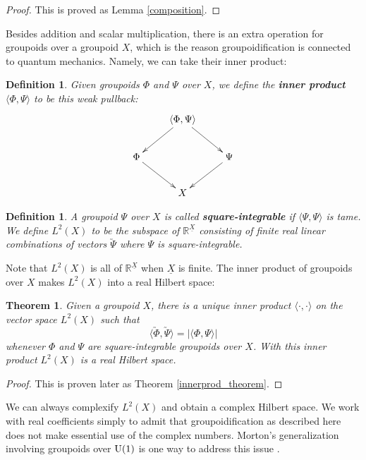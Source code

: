 \documentclass{article}
\newcommand{\R}{{\mathbb R}}
\newcommand{\U}{{\rm U}}
\newcommand{\ip}[2]{\langle #1,#2 \rangle}
\renewcommand{\u}[1]{\underline{#1}}
\newtheorem{definition}[thm]{Definition}
\newtheorem*{theorem*}{Theorem}
\begin{document}
\begin{proof} This is proved as Lemma \ref{composition}.
\end{proof}

Besides addition and scalar multiplication, there is an extra
operation for groupoids over a groupoid $X$, which is the reason
groupoidification is connected to quantum mechanics.  Namely, we can
take their inner product:

\begin{definition}
Given groupoids $\Phi$ and $\Psi$ over $X$, we define
the {\bf inner product} $\ip{\Phi}{\Psi}$ to be this weak pullback:
\[
\xymatrix{
& \ip{\Phi}{\Psi} \ar[dl] \ar[dr] & \\
\Phi \ar[dr] & & \Psi \ar[dl] \\
& X &
}
\]
\end{definition}
\begin{definition}
\label{L2}
A groupoid $\Psi$ over $X$ is called {\bf square-integrable} if
$\ip{\Psi}{\Psi}$ is tame.  We define $L^2(X)$ to be the subspace of
$\R^{\u{X}}$ consisting of finite real linear combinations of vectors
$\utilde{\Psi}$ where $\Psi$ is square-integrable.
\end{definition}

Note that $L^2(X)$ is all of $\R^{\u{X}}$ when $\u{X}$
is finite.  The inner product of groupoids over $X$ makes $L^2(X)$
into a real Hilbert space:
\begin{theorem*}
Given a groupoid $X$, there is a unique inner product $\ip{\cdot}{\cdot}$ 
on the vector space $L^2(X)$ such that
\[ \ip{\utilde{\Phi}}{\utilde{\Psi}} = |\ip{\Phi}{\Psi}| \]
whenever $\Phi$ and $\Psi$ are square-integrable groupoids over $X$.
With this inner product $L^2(X)$ is a real Hilbert space.
\end{theorem*}
\begin{proof} This is proven later as Theorem \ref{innerprod_theorem}. 
\end{proof}
We can always complexify $L^2(X)$ and obtain a complex
Hilbert space.  We work with real coefficients simply to admit that
groupoidification as described here does not make essential use of the
complex numbers.  Morton's generalization involving groupoids over
$\U(1)$ is one way to address this issue \cite{Morton:2006}.
\end{document}
